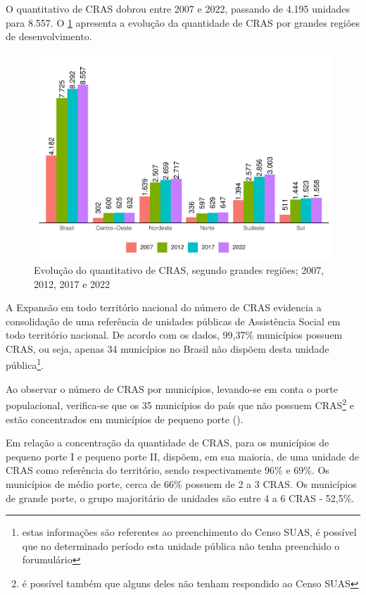 \documentclass[
  brazilian]{report}
\begin{document}
O quantitativo de CRAS dobrou entre 2007 e 2022, passando de 4.195
unidades para 8.557. O \cref{fig:quantitativo-CRAS} apresenta a evolução
da quantidade de CRAS por grandes regiões de desenvolvimento.

\begin{figure}
\includegraphics{Censo-SUAS-2022_files/figure-latex/quantitativo-CRAS-1} \caption[Evolução do quantitativo de CRAS, segundo grandes regiões]{Evolução do quantitativo de CRAS, segundo grandes regiões; 2007, 2012, 2017 e 2022}\label{fig:quantitativo-CRAS}
\end{figure}

A Expansão em todo território nacional do número de CRAS evidencia a
consolidação de uma referência de unidades públicas de Assistência
Social em todo território nacional. De acordo com os dados, 99,37\%
municípios possuem CRAS, ou seja, apenas 34 municípios no Brasil não
dispõem desta unidade
pública\footnote{estas informações são referentes ao preenchimento do Censo SUAS, é possível que no determinado período esta unidade pública não tenha preenchido o forumulário}.

Ao observar o número de CRAS por municípios, levando-se em conta o porte
populacional, verifica-se que os 35 municípios do país que não possuem
CRAS\footnote{é possível também que alguns deles não tenham respondido ao Censo SUAS}
e estão concentrados em municípios de pequeno porte
().

Em relação a concentração da quantidade de CRAS, para os municípios de
pequeno porte I e pequeno porte II, dispõem, em sua maioria, de uma
unidade de CRAS como referência do território, sendo respectivamente
96\% e 69\%. Os municípios de médio porte, cerca de 66\% possuem de 2 a
3 CRAS. Os municípios de grande porte, o grupo majoritário de unidades
são entre 4 a 6 CRAS - 52,5\%.
\end{document}
